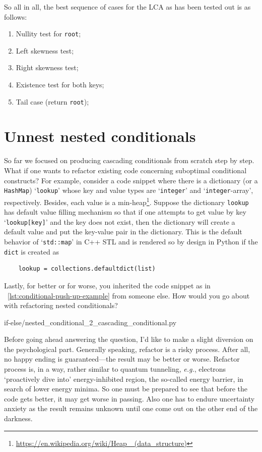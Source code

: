 \documentclass[oneside,11pt]{book}
\theoremstyle{definition}
\theoremstyle{remark}
\newcommand{\code}[1]{\mbox{\lstinline{#1}}}
\newcommand{\python}{Python }
\newcommand{\cpp}{C++ }
\begin{document}
So all in all, the best sequence of cases for the LCA as has been tested out is as follows:
\begin{enumerate}
    \item Nullity test for \code{root};
    \item Left skewness test;
    \item Right skewness test;
    \item Existence test for both keys;
    \item Tail case (return \code{root});
\end{enumerate}

\section{Unnest nested conditionals}\label{sec:unnestnestedconditionals}

So far we focused on producing cascading conditionals from scratch step by step.
What if one wants to refactor existing code concerning suboptimal conditional constructs?
For example, consider a code snippet where there
is a dictionary (or a \code{HashMap}) `\code{lookup}' whose key and value types are
`\code{integer}' and `\code{integer}-array', respectively.
Besides, each value is a min-heap\footnote{\url{https://en.wikipedia.org/wiki/Heap_
(data_structure)}}.
Suppose the dictionary \code{lookup} has default value filling mechanism so that
if one attempts to get value by key `\code{lookup[key]}' and the key does not exist, then the
dictionary will create a default value and put the key-value pair in the dictionary.
This is the default behavior of `\code{std::map}' in \cpp STL and
is rendered so by design in \python if the \code{dict} is created as
\begin{lstlisting}
    lookup = collections.defaultdict(list)
\end{lstlisting}
Lastly, for better or for worse, you inherited the code snippet
as in ~\autoref{lst:conditional-push-up-example} from someone else.
How would you go about with refactoring nested conditionals?
\begin{clisting}[htb]
    
    {if-else/nested_conditional_2_cascading_conditional.py}
\end{clisting}


Before going ahead answering the question, I'd like to make a slight diversion on the
psychological part.
Generally speaking, refactor is a risky process.
After all, no happy ending is guaranteed---the result may be better or worse.
Refactor process is, in a way, rather similar to quantum tunneling, \textit{e.g.}, electrons
`proactively dive into' energy-inhibited region, the so-called energy barrier,
in search of lower energy minima.
So one must be prepared to see that before the code gets better, it may get worse in passing.
Also one has to endure uncertainty anxiety as the result remains unknown until one come out on
the other end of the darkness.
\end{document}
